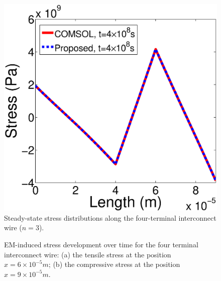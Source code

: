 \begin{figure}[!h]
\centering
\includegraphics[width=0.7\columnwidth]{S3StableT0.eps}
\caption{Steady-state stress distributions along the four-terminal interconnect wire ($n=3$).}
\label{fig:S3StableT0}
\end{figure}

\begin{figure}[!h]
\centering
{}
\caption{EM-induced stress development over time for the four terminal interconnect wire: (a) the tensile stress at the position $x=6\times 10^{-5}m$; (b) the compressive stress at the position $x=9\times 10^{-5}m$.}
\label{fig:S3Results2}
\end{figure}

